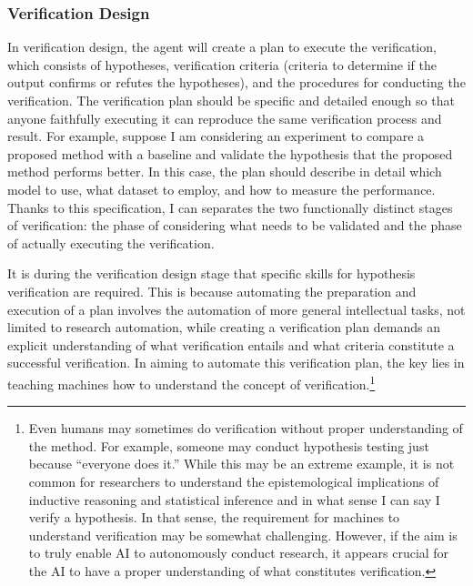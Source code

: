 \documentclass{article}
\begin{document}
\subsubsection{Verification Design} 
In verification design, the agent will create a plan to execute the verification, which consists of hypotheses, verification criteria (criteria to determine if the output confirms or refutes the hypotheses), and the procedures for conducting the verification. The verification plan should be specific and detailed enough so that anyone faithfully executing it can reproduce the same verification process and result. For example, suppose I am considering an experiment to compare a proposed method with a baseline and validate the hypothesis that the proposed method performs better. In this case, the plan should describe in detail which model to use, what dataset to employ, and how to measure the performance. Thanks to this specification, I can separates the two functionally distinct stages of verification: the phase of considering what needs to be validated and the phase of actually executing the verification.

It is during the verification design stage that specific skills for hypothesis verification are required. This is because automating the preparation and execution of a plan involves the automation of more general intellectual tasks, not limited to research automation, while creating a verification plan demands an explicit understanding of what verification entails and what criteria constitute a successful verification. In aiming to automate this verification plan, the key lies in teaching machines how to understand the concept of verification.\footnote{
Even humans may sometimes do verification without proper understanding of the method. For example, someone may conduct hypothesis testing just because ``everyone does it.'' While this may be an extreme example, it is not common for researchers to understand the epistemological implications of inductive reasoning and statistical inference and in what sense I can say I verify a hypothesis. In that sense, the requirement for machines to understand verification may be somewhat challenging. However, if the aim is to truly enable AI to autonomously conduct research, it appears crucial for the AI to have a proper understanding of what constitutes verification.
}

\end{document}
